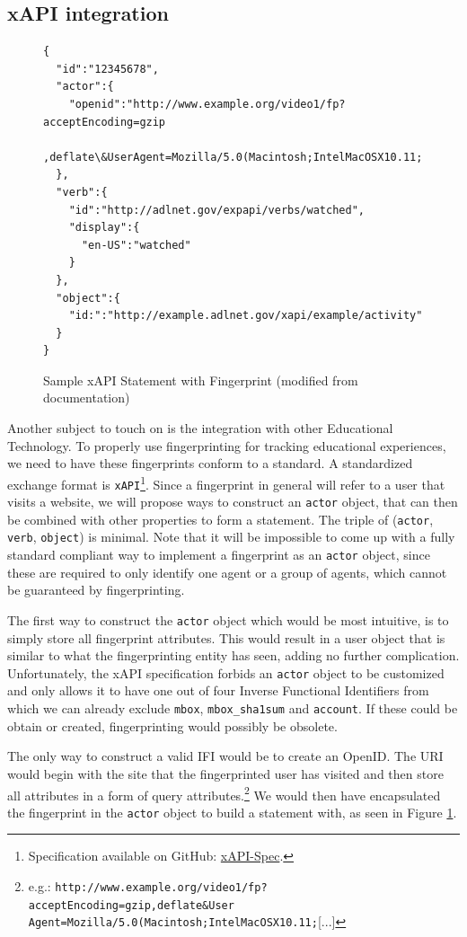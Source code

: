 \pagebreak
\subsection{xAPI integration}

\begin{figure}
\centering
\tiny
\begin{verbatim}
{
  "id":"12345678",
  "actor":{
    "openid":"http://www.example.org/video1/fp?acceptEncoding=gzip
      ,deflate\&UserAgent=Mozilla/5.0(Macintosh;IntelMacOSX10.11;.."
  },
  "verb":{
    "id":"http://adlnet.gov/expapi/verbs/watched",
    "display":{
      "en-US":"watched"
    }
  },
  "object":{
    "id:":"http://example.adlnet.gov/xapi/example/activity"
  }
}
\end{verbatim}
\caption{Sample xAPI Statement with Fingerprint (modified from documentation)}
\label{fig:xapi}
\end{figure}

Another subject to touch on is the integration with other Educational Technology. To properly use fingerprinting for tracking educational experiences, we need to have these fingerprints conform to a standard. A standardized exchange format is \texttt{xAPI}\footnote{Specification available on GitHub: \href{https://github.com/adlnet/xAPI-Spec}{xAPI-Spec}.}. Since a fingerprint in general will refer to a user that visits a website, we will propose ways to construct an \texttt{actor} object, that can then be combined with other properties to form a statement. The triple of (\texttt{actor}, \texttt{verb}, \texttt{object}) is minimal. Note that it will be impossible to come up with a fully standard compliant way to implement a fingerprint as an \texttt{actor} object, since these are required to only identify one agent or a group of agents, which cannot be guaranteed by fingerprinting.

The first way to construct the \texttt{actor} object which would be most intuitive, is to simply store all fingerprint attributes. This would result in a user object that is similar to what the fingerprinting entity has seen, adding no further complication.
Unfortunately, the xAPI specification forbids an \texttt{actor} object to be customized and only allows it to have one out of four Inverse Functional Identifiers from which we can already exclude \texttt{mbox}, \texttt{mbox\_sha1sum} and \texttt{account}. If these could be obtain or created, fingerprinting would possibly be obsolete. 

The only way to construct a valid IFI would be to create an OpenID. The URI would begin with the site that the fingerprinted user has visited and then store all attributes in a form of query attributes.\footnote{e.g.: \texttt{http://www.example.org/video1/fp?acceptEncoding=gzip,deflate\&User Agent=Mozilla/5.0(Macintosh;IntelMacOSX10.11;}[...]} We would then have encapsulated the fingerprint in the \texttt{actor} object to build a statement with, as seen in Figure \ref{fig:xapi}.

